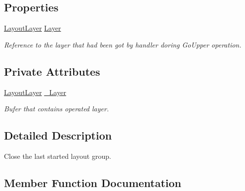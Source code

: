 \subsection*{Properties}
\begin{DoxyCompactItemize}
\item 
\mbox{\hyperlink{class_wpf_handler_1_1_u_i_1_1_auto_layout_1_1_layout_layer}{Layout\+Layer}} \mbox{\hyperlink{class_wpf_handler_1_1_u_i_1_1_auto_layout_1_1_configuration_1_1_end_group_attribute_aa49aeed9019ee998b6b85920251ce7c2}{Layer}}
\begin{DoxyCompactList}\small\item\em Reference to the layer that had been got by handler doring Go\+Upper operation. \end{DoxyCompactList}\end{DoxyCompactItemize}
\subsection*{Private Attributes}
\begin{DoxyCompactItemize}
\item 
\mbox{\hyperlink{class_wpf_handler_1_1_u_i_1_1_auto_layout_1_1_layout_layer}{Layout\+Layer}} \mbox{\hyperlink{class_wpf_handler_1_1_u_i_1_1_auto_layout_1_1_configuration_1_1_end_group_attribute_a8f6eb211c88e7d5ade018a8f79d34a17}{\+\_\+\+Layer}}
\begin{DoxyCompactList}\small\item\em Bufer that contains operated layer. \end{DoxyCompactList}\end{DoxyCompactItemize}


\subsection{Detailed Description}
Close the last started layout group. 



\subsection{Member Function Documentation}
\mbox{\label{class_wpf_handler_1_1_u_i_1_1_auto_layout_1_1_configuration_1_1_end_group_attribute_acaed685d0daf2b14d8f232389d56c478}} 
